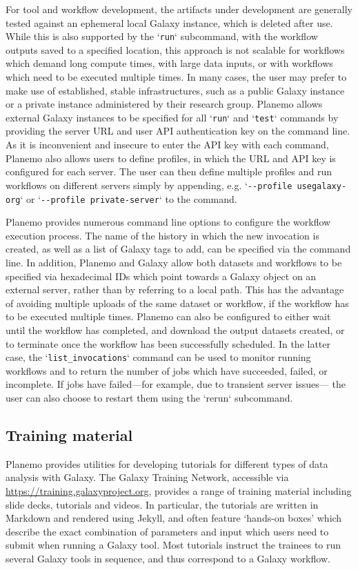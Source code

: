 For tool and workflow development, the artifacts under development are
generally tested against an ephemeral local Galaxy instance, which is
deleted after use. While this is also supported by the `\texttt{run}`
subcommand, with the workflow outputs saved to a specified location,
this approach is not scalable for workflows which demand long compute
times, with large data inputs, or with workflows which need to be
executed multiple times. In many cases, the user may prefer to make use
of established, stable infrastructures, such as a public Galaxy instance
or a private instance administered by their research group. Planemo
allows external Galaxy instances to be specified for all `\texttt{run}`
and `\texttt{test}` commands by providing the server URL and user API
authentication key on the command line. As it is inconvenient and
insecure to enter the API key with each command, Planemo also allows
users to define profiles, in which the URL and API key is configured for
each server. The user can then define multiple profiles and run
workflows on different servers simply by appending, e.g.
`\texttt{-\/-profile\ usegalaxy-org}` or
`\texttt{-\/-profile\ private-server}` to the command.

Planemo provides numerous command line options to configure the workflow
execution process. The name of the history in which the new invocation
is created, as well as a list of Galaxy tags to add, can be specified
via the command line. In addition, Planemo and Galaxy allow both
datasets and workflows to be specified via hexadecimal IDs which point
towards a Galaxy object on an external server, rather than by referring
to a local path. This has the advantage of avoiding multiple uploads of
the same dataset or workflow, if the workflow has to be executed
multiple times. Planemo can also be configured to either wait until the
workflow has completed, and download the output datasets created, or to
terminate once the workflow has been successfully scheduled. In the
latter case, the `\texttt{list\_invocations}` command can be used to
monitor running workflows and to return the number of jobs which have
succeeded, failed, or incomplete. If jobs have failed---for example, due
to transient server issues--- the user can also choose to restart them
using the `rerun` subcommand.

\subsection*{Training material}

Planemo provides utilities for developing tutorials for different types
of data analysis with Galaxy. The Galaxy Training Network, accessible
via
\protect\hypertarget{ext-link-13}{\url{https://training.galaxyproject.org}},
provides a range of training material including slide decks, tutorials
and videos. In particular, the tutorials are written in Markdown and
rendered using Jekyll, and often feature `hands-on boxes' which describe
the exact combination of parameters and input which users need to submit
when running a Galaxy tool. Most tutorials instruct the trainees to run
several Galaxy tools in sequence, and thus correspond to a Galaxy
workflow.


